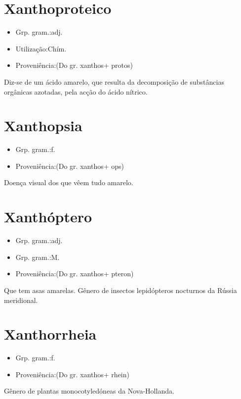 \section{Xanthoproteico}
\begin{itemize}
\item {Grp. gram.:adj.}
\end{itemize}
\begin{itemize}
\item {Utilização:Chím.}
\end{itemize}
\begin{itemize}
\item {Proveniência:(Do gr. \textunderscore xanthos\textunderscore  + \textunderscore protos\textunderscore )}
\end{itemize}
Diz-se de um ácido amarelo, que resulta da decomposição de substâncias orgânicas azotadas, pela acção do ácido nítrico.
\section{Xanthopsia}
\begin{itemize}
\item {Grp. gram.:f.}
\end{itemize}
\begin{itemize}
\item {Proveniência:(Do gr. \textunderscore xanthos\textunderscore  + \textunderscore ops\textunderscore )}
\end{itemize}
Doença visual dos que vêem tudo amarelo.
\section{Xanthóptero}
\begin{itemize}
\item {Grp. gram.:adj.}
\end{itemize}
\begin{itemize}
\item {Grp. gram.:M.}
\end{itemize}
\begin{itemize}
\item {Proveniência:(Do gr. \textunderscore xanthos\textunderscore  + \textunderscore pteron\textunderscore )}
\end{itemize}
Que tem asas amarelas.
Gênero de insectos lepidópteros nocturnos da Rússia meridional.
\section{Xanthorrheia}
\begin{itemize}
\item {Grp. gram.:f.}
\end{itemize}
\begin{itemize}
\item {Proveniência:(Do gr. \textunderscore xanthos\textunderscore  + \textunderscore rhein\textunderscore )}
\end{itemize}
Gênero de plantas monocotyledóneas da Nova-Hollanda.
